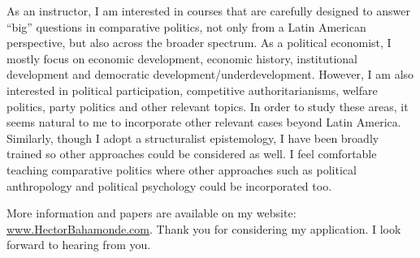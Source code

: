 \documentclass[10pt,stdletter,dateno,sigleft]{newlfm} %
\begin{document}
\begin{newlfm}
As an instructor, I am interested in courses that are carefully designed to answer ``big'' questions in comparative politics, not only from a Latin American perspective, but also across the broader spectrum. As a political economist, I mostly focus on economic development, economic history, institutional development and democratic development/underdevelopment. However, I am also interested in political participation, competitive authoritarianisms, welfare politics, party politics and other relevant topics. In order to study these areas, it seems natural to me to incorporate other relevant cases beyond Latin America. Similarly, though I adopt a structuralist epistemology, I have been broadly trained so other approaches could be considered as well. I feel comfortable teaching comparative politics where other approaches such as political anthropology and political psychology could be incorporated too.


More information and papers are available on my website: \href{http://www.hectorbahamonde.com}{www.HectorBahamonde.com}. Thank you for considering my application. I look forward to hearing from you.






\end{newlfm}
\end{document}
